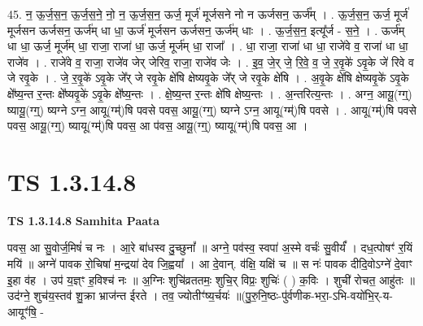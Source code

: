 \documentclass[17pt]{extarticle}
\begin{document}
45. न॒ ऊ॒र्ज॒स॒न॒ ऊ॒र्ज॒स॒ने॒ नो॒ न॒ ऊ॒र्ज॒स॒न॒ ऊर्ज॒ मूर्ज॑ मूर्जसने नो न ऊर्जसन॒ ऊर्ज᳚म् । . ऊ॒र्ज॒स॒न॒ ऊर्ज॒ मूर्ज॑ मूर्जसन ऊर्जसन॒ ऊर्ज॑म् धा धा॒ ऊर्ज॑ मूर्जसन ऊर्जसन॒ ऊर्ज॑म् धाः । . ऊ॒र्ज॒स॒न॒ इत्यू᳚र्ज - स॒ने॒ । . ऊर्ज॑म् धा धा॒ ऊर्ज॒ मूर्ज॑म् धा॒ राजा॒ राजा॑ धा॒ ऊर्ज॒ मूर्ज॑म् धा॒ राजा᳚ । . धा॒ राजा॒ राजा॑ धा धा॒ राजे॑वे व॒ राजा॑ धा धा॒ राजे॑व । . राजे॑वे व॒ राजा॒ राजे॑व जेर् जेरिव॒ राजा॒ राजे॑व जेः । . इ॒व॒ जे॒र् जे॒ रि॒वे॒ व॒ जे॒ र॒वृ॒के॑ ऽवृ॒के जे॑ रिवे व जे रवृ॒के । . जे॒ र॒वृ॒के॑ ऽवृ॒के जे᳚र् जे रवृ॒के क्षे॑षि क्षेष्यवृ॒के जे᳚र् जे रवृ॒के क्षे॑षि । . अ॒वृ॒के क्षे॑षि क्षेष्यवृ॒के॑ ऽवृ॒के क्षे᳚ष्य॒न्त र॒न्तः क्षे᳚ष्यवृ॒के॑ ऽवृ॒के क्षे᳚ष्य॒न्तः । . क्षे॒ष्य॒न्त र॒न्तः क्षे॑षि क्षेष्य॒न्तः । . अ॒न्तरित्य॒न्तः । . अग्न॒ आयू॒(ग्ग्॒) ष्यायू॒(ग्ग्॒) ष्यग्ने ऽग्न॒ आयू(ग्म्॑)षि पवसे पवस॒ आयू॒(ग्ग्॒) ष्यग्ने ऽग्न॒ आयू(ग्म्॑)षि पवसे । . आयू(ग्म्॑)षि पवसे पवस॒ आयू॒(ग्ग्॒) ष्यायू(ग्म्॑)षि पवस॒ आ प॑वस॒ आयू॒(ग्ग्॒) ष्यायू(ग्म्॑)षि पवस॒ आ । \newline
\pagebreak
{}

\section{ TS 1.3.14.8 }

\textbf{TS 1.3.14.8 } \newline
\textbf{Samhita Paata} \newline

पवस॒ आ सु॒वोर्ज॒मिषं॑ च नः । आ॒रे बा॑धस्व दु॒च्छुनां᳚ ॥ अग्ने॒ पव॑स्व॒ स्वपा॑ अ॒स्मे वर्चः॑ सु॒वीर्यं᳚ । दध॒त्पोषꣳ॑ र॒यिं मयि॑ ॥ अग्ने॑ पावक रो॒चिषा॑ म॒न्द्रया॑ देव जि॒ह्वया᳚ । आ दे॒वान्. व॑क्षि॒ यक्षि॑ च ॥ स नः॑ पावक दीदि॒वोऽग्ने॑ दे॒वाꣳ इ॒हा व॑ह । उप॑ य॒ज्ञ्ꣳ ह॒विश्च॑ नः ॥ अ॒ग्निः शुचि॑व्रततमः॒ शुचि॒र् विप्रः॒ शुचिः॑ ( ) क॒विः । शुची॑ रोचत॒ आहु॑तः ॥ उद॑ग्ने॒ शुच॑य॒स्तव॑ शु॒क्रा भ्राज॑न्त ईरते । तव॒ ज्योतीꣳ॑ष्य॒र्चयः॑ ॥(पु॒रु॒नि॒ष्ठः-पु॑र्वणीक-भरा॒-ऽभि-वयो॑भि॒र्-य-आयूꣳ॑षि॒ - \newline
\end{document}
